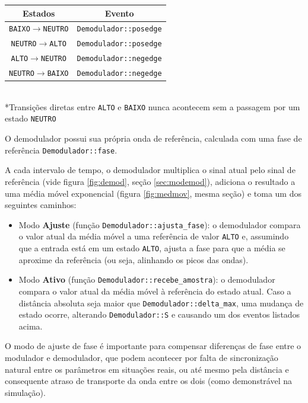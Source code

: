 \documentclass[titlepage,twocolumn]{article}
\begin{document}
\begin{center}
    \begin{tabular}{c | c }
        \hline
        Estados & Evento\\
        \hline
        \texttt{BAIXO}$\rightarrow$\texttt{NEUTRO} & \texttt{Demodulador::posedge}\\
        \texttt{NEUTRO}$\rightarrow$\texttt{ALTO} & \texttt{Demodulador::posedge}\\
        \texttt{ALTO}$\rightarrow$\texttt{NEUTRO} & \texttt{Demodulador::negedge}\\
        \texttt{NEUTRO}$\rightarrow$\texttt{BAIXO} & \texttt{Demodulador::negedge}\\
        \hline
    \end{tabular}\\

    \small{*Transições diretas entre \texttt{ALTO} e \texttt{BAIXO} nunca acontecem sem a passagem por um estado \texttt{NEUTRO}}
\end{center}

O demodulador possui sua própria onda de referência, calculada com uma fase de referência \texttt{Demodulador::fase}.

A cada intervalo de tempo, o demodulador multiplica o sinal atual pelo sinal de referência (vide figura \ref{fig:demod}, seção \ref{sec:modemod}), adiciona o resultado a uma média móvel exponencial (figura \ref{fig:medmov}, mesma seção) e toma um dos seguintes caminhos:
\begin{itemize}
    \item Modo \textbf{Ajuste} (função \texttt{Demodulador::ajusta\_fase}): o demodulador compara o valor atual da média móvel a uma referência de valor \texttt{ALTO} e, assumindo que a entrada está em um estado \texttt{ALTO}, ajusta a fase para que a média se aproxime da referência (ou seja, alinhando os picos das ondas).
    \item Modo \textbf{Ativo} (função \texttt{Demodulador::recebe\_amostra}): o demodulador compara o valor atual da média móvel à referência do estado atual. Caso a distância absoluta seja maior que \texttt{Demodulador::delta\_max}, uma mudança de estado ocorre, alterando \texttt{Demodulador::S} e causando um dos eventos listados acima.
\end{itemize}

O modo de ajuste de fase é importante para compensar diferenças de fase entre o modulador e demodulador, que podem acontecer por falta de sincronização natural entre os parâmetros em situações reais, ou até mesmo pela distância e consequente atraso de transporte da onda entre os dois (como demonstrável na simulação).
\end{document}
